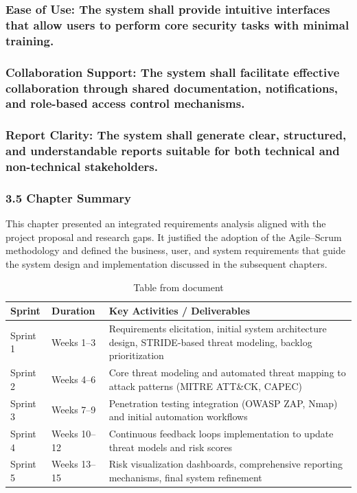 \documentclass[12pt,a4paper]{report}
\begin{document}
\subsubsection{Ease of Use: The system shall provide intuitive interfaces that allow users to perform core security tasks with minimal training.}

\subsubsection{Collaboration Support: The system shall facilitate effective collaboration through shared documentation, notifications, and role-based access control mechanisms.}

\subsubsection{Report Clarity: The system shall generate clear, structured, and understandable reports suitable for both technical and non-technical stakeholders.}

\subsubsection{3.5 Chapter Summary}

This chapter presented an integrated requirements analysis aligned with the project proposal and research gaps. It justified the adoption of the Agile–Scrum methodology and defined the business, user, and system requirements that guide the system design and implementation discussed in the subsequent chapters.

\begin{table}[H]
\centering
\small
\begin{tabularx}{\textwidth}{|l|l|l|}
\hline
Sprint & Duration & Key Activities / Deliverables \\
\hline\hline
Sprint 1 & Weeks 1–3 & Requirements elicitation, initial system architecture design, STRIDE-based threat modeling, backlog prioritization \\
\hline
Sprint 2 & Weeks 4–6 & Core threat modeling and automated threat mapping to attack patterns (MITRE ATT\&CK, CAPEC) \\
\hline
Sprint 3 & Weeks 7–9 & Penetration testing integration (OWASP ZAP, Nmap) and initial automation workflows \\
\hline
Sprint 4 & Weeks 10–12 & Continuous feedback loops implementation to update threat models and risk scores \\
\hline
Sprint 5 & Weeks 13–15 & Risk visualization dashboards, comprehensive reporting mechanisms, final system refinement \\
\hline
\end{tabularx}
\caption{Table from document}
\end{table}
\end{document}
